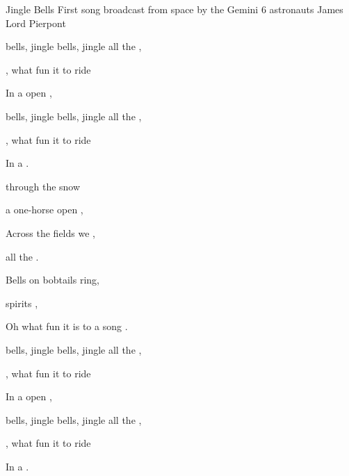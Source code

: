 \begin{SBSong}{Jingle Bells}
    {First song broadcast from space by the Gemini 6 astronauts}
    {James Lord Pierpont}
  \begin{SBVerse}
	 bells, jingle bells, jingle all the ,

	, what fun it  to ride

	In a  open , 

	 bells, jingle bells, jingle all the ,

	, what fun it  to ride

	In a   .
  \end{SBVerse}
  \begin{SBVerse}
	 through the snow

	 a one-horse open ,

	Across the fields we ,

	 all the .

	Bells on bobtails ring,

	 spirits ,

	Oh what fun it is to  a  song .
  \end{SBVerse}
  \begin{SBVerse}
	 bells, jingle bells, jingle all the ,

	, what fun it  to ride

	In a  open , 

	 bells, jingle bells, jingle all the ,

	, what fun it  to ride
	
	In a   .
  \end{SBVerse}
\end{SBSong}
